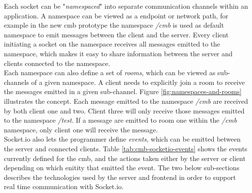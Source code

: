 Each socket can be "\textit{namespaced}" into separate communication channels within an application. A namespace can be viewed as a endpoint or network path, for example in the new \gls{cmb} prototype the namespace \textit{/cmb} is used as default namespace to emit messages between the client and the server. Every client initiating a socket on the namespace receives all messages emitted to the namespace, which makes it easy to share information between the server and clients connected to the namespace. \\

Each namespace can also define a set of \textit{rooms}, which can be viewed as sub-channels of a given namespace. A client needs to explicitly join a room to receive the messages emitted in a given sub-channel. Figure \ref{fig:namespaces-and-rooms} illustrates the concept. Each message emitted to the namespace \textit{/cmb} are received by both client one and two. Client three will only receive those messages emitted to the namespace \textit{/test}. If a message are emitted to room one within the \textit{/cmb} namespace, only client one will receive the message. \\

Socket.io also lets the programmer define \textit{events}, which can be emitted between the server and connected clients. Table \ref{tab:cmb-socketio-events} shows the events currently defined for the \gls{cmb}, and the actions taken either by the server or client depending on which enitity that emitted the event. The two below sub-sections describes the technologies used by the server and frontend in order to support real time communication with Socket.io.

